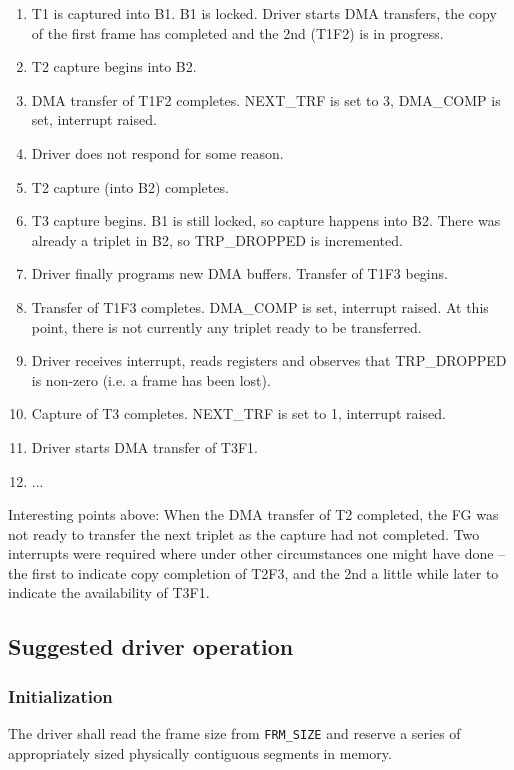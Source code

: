 \documentclass[12pt]{article}
\begin{document}
\begin{enumerate}
\item T1 is captured into B1. B1 is locked. Driver starts DMA transfers, the copy of the first frame has completed and the 2nd (T1F2) is in progress.
\item T2 capture begins into B2.
\item DMA transfer of T1F2 completes. NEXT\_TRF is set to 3, DMA\_COMP is set, interrupt raised.
\item Driver does not respond for some reason.
\item T2 capture (into B2) completes.
\item T3 capture begins. B1 is still locked, so capture happens into B2. There was already a triplet in B2, so TRP\_DROPPED is incremented.
\item Driver finally programs new DMA buffers. Transfer of T1F3 begins.
\item Transfer of T1F3 completes. DMA\_COMP is set, interrupt raised. At this point, there is not currently any triplet ready to be transferred.
\item Driver receives interrupt, reads registers and observes that TRP\_DROPPED is non-zero (i.e. a frame has been lost).
\item Capture of T3 completes. NEXT\_TRF is set to 1, interrupt raised.
\item Driver starts DMA transfer of T3F1.
\item ...
\end{enumerate}

Interesting points above: When the DMA transfer of T2 completed, the FG was not ready to transfer the next triplet as the capture had not completed. Two interrupts were required where under other circumstances one might have done -- the first to indicate copy completion of T2F3, and the 2nd a little while later to indicate the availability of T3F1.

\subsection{Suggested driver operation}

\subsubsection{Initialization}

The driver shall read the frame size from \texttt{FRM\_SIZE} and reserve a series of appropriately sized physically contiguous segments in memory.
\end{document}
